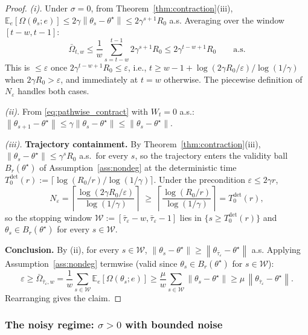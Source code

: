 \documentclass[12pt,a4paper]{article}
\newcommand{\norm}[1]{\left\lVert#1\right\rVert}
\newcommand{\Ogap}{\Omega}
\begin{document}
\begin{proof}
\emph{(i).}
Under $\sigma = 0$, from Theorem~\ref{thm:contraction}(iii),
$\mathbb{E}_e[\Ogap(\theta_s; e)] \leq 2\gamma\norm{\theta_s - \theta^\star}
\leq 2\gamma^{s+1} R_0$ a.s. Averaging over the window $[t-w, t-1]$:
\[
  \bar\Ogap_{t,w}
  \leq \frac{1}{w}\sum_{s=t-w}^{t-1} 2\gamma^{s+1} R_0
  \leq 2\gamma^{t-w+1} R_0 \qquad \text{a.s.}
\]
This is $\leq \varepsilon$ once $2\gamma^{t-w+1} R_0 \leq \varepsilon$, i.e.,
$t \geq w - 1 + \log(2\gamma R_0/\varepsilon)/\log(1/\gamma)$ when
$2\gamma R_0 > \varepsilon$, and immediately at $t = w$ otherwise.
The piecewise definition of $N_\varepsilon$ handles both cases.

\emph{(ii).}
From \eqref{eq:pathwise_contract} with $W_t = 0$ a.s.:
$\norm{\theta_{s+1} - \theta^\star} \leq \gamma \norm{\theta_s - \theta^\star}
\leq \norm{\theta_s - \theta^\star}$.

\emph{(iii).}
\textbf{Trajectory containment.}
By Theorem~\ref{thm:contraction}(iii), $\norm{\theta_s - \theta^\star} \leq
\gamma^s R_0$ a.s.\ for every $s$, so the trajectory enters the validity
ball $B_r(\theta^\star)$ of Assumption~\ref{ass:nondeg} at the deterministic
time $T_0^{\mathrm{det}}(r) := \lceil \log(R_0/r)/\log(1/\gamma) \rceil$.
Under the precondition $\varepsilon \leq 2\gamma r$,
\[
  N_\varepsilon
  = \left\lceil \frac{\log(2\gamma R_0/\varepsilon)}{\log(1/\gamma)} \right\rceil
  \;\geq\; \left\lceil \frac{\log(R_0/r)}{\log(1/\gamma)} \right\rceil
  = T_0^{\mathrm{det}}(r),
\]
so the stopping window $\mathcal{W} := [\bar\tau_\varepsilon - w,
\bar\tau_\varepsilon - 1]$ lies in $\{s \geq T_0^{\mathrm{det}}(r)\}$ and
$\theta_s \in B_r(\theta^\star)$ for every $s \in \mathcal{W}$.

\textbf{Conclusion.}
By (ii), for every $s \in \mathcal{W}$,
$\norm{\theta_s - \theta^\star} \geq \norm{\theta_{\bar\tau_\varepsilon} -
\theta^\star}$ a.s. Applying Assumption~\ref{ass:nondeg} termwise (valid
since $\theta_s \in B_r(\theta^\star)$ for $s \in \mathcal{W}$):
\[
  \varepsilon \geq \bar\Ogap_{\bar\tau_\varepsilon, w}
  = \frac{1}{w}\sum_{s \in \mathcal{W}} \mathbb{E}_e[\Ogap(\theta_s; e)]
  \geq \frac{\mu}{w}\sum_{s \in \mathcal{W}} \norm{\theta_s - \theta^\star}
  \geq \mu\, \norm{\theta_{\bar\tau_\varepsilon} - \theta^\star}.
\]
Rearranging gives the claim. \qedhere
\end{proof}

\subsubsection*{The noisy regime: $\sigma > 0$ with bounded noise}
\end{document}
